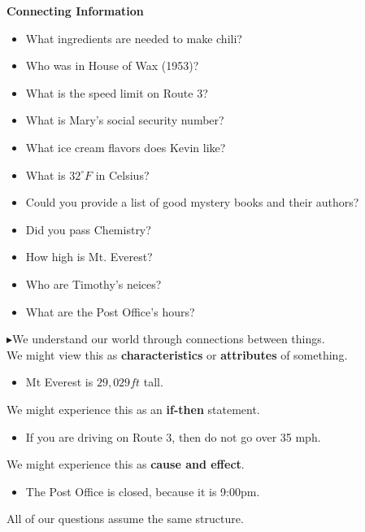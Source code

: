 \documentclass{ximera}
\begin{document}
\begin{observation} \textbf{\textcolor{blue!75!black}{Connecting Information}}  

\begin{itemize} 
\item What ingredients are needed to make chili?
\item Who was in House of Wax (1953)?
\item What is the speed limit on Route 3?
\item What is Mary's social security number?
\item What ice cream flavors does Kevin like?
\item What is $32^\circ F$ in Celsius?
\item Could you provide a list of good mystery books and their authors?
\item Did you pass Chemistry?
\item How high is Mt. Everest?
\item Who are Timothy's neices?
\item What are the Post Office's hours?
\end{itemize}

$\blacktriangleright$We understand our world through connections between things. \\


We might view this as \textbf{\textcolor{purple!85!blue}{characteristics}} or \textbf{\textcolor{purple!85!blue}{attributes}} of something. 
\begin{itemize}
\item Mt Everest is $29,029 ft$ tall.
\end{itemize}


We might experience this as an \textbf{\textcolor{purple!85!blue}{if-then}} statement.
\begin{itemize}
\item If you are driving on Route 3, then do not go over 35 mph.
\end{itemize}



We might experience this as \textbf{\textcolor{purple!85!blue}{cause and effect}}.
\begin{itemize}
\item The Post Office is closed, because it is 9:00pm.
\end{itemize}

\end{observation}


All of our questions assume the same structure.  \\
\end{document}
